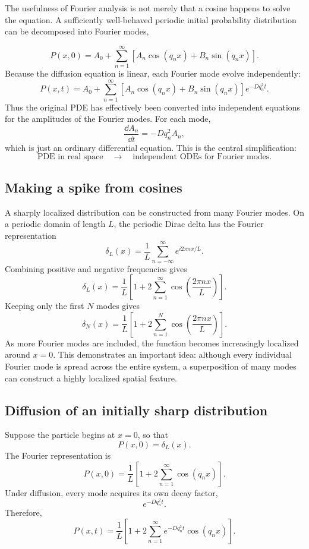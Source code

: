 The usefulness of Fourier analysis is not merely that a cosine happens to solve the equation.
A sufficiently well-behaved periodic initial probability distribution can be decomposed into Fourier modes,

\[
    P(x,0) = A_0 + \sum_{n=1}^{\infty} \left[ A_n\cos(q_nx) + B_n\sin(q_nx) \right].
\]
% 
Because the diffusion equation is linear, each Fourier mode evolve independently:
% 
\[
    P(x,t) = A_0 + \sum_{n=1}^{\infty} \left[ A_n\cos(q_nx) + B_n\sin(q_nx) \right] e^{-Dq_n^2t}.
\]
% 
Thus the original PDE has effectively been converted into independent equations for the amplitudes of the Fourier modes.
% 
For each mode,
% 
\[
    \frac{\dd A_n}{\dd t} = -Dq_n^2A_n,
\]
% 
which is just an ordinary differential equation.
% 
This is the central simplification:
% 
\[
    \boxed{
        \text{PDE in real space}
        \quad\longrightarrow\quad
        \text{independent ODEs for Fourier modes}.
    }
\]


\subsection{Making a spike from cosines}

A sharply localized distribution can be constructed from many Fourier modes.
On a periodic domain of length $L$, the periodic Dirac delta has the Fourier representation
% 
\[
    \boxed{
        \delta_L(x) = \frac{1}{L} \sum_{n=-\infty}^{\infty} e^{i2\pi nx/L}.
    }
\]
% 
Combining positive and negative frequencies gives
% 
\[
    \boxed{
        \delta_L(x) = \frac{1}{L} \left[ 1 + 2\sum_{n=1}^{\infty} \cos\left( \frac{2\pi n x}{L} \right) \right].
    }
\]
% 
Keeping only the first $N$ modes gives
% 
\[
    \delta_N(x) = \frac{1}{L} \left[ 1 + 2\sum_{n=1}^{N} \cos\left( \frac{2\pi n x}{L} \right) \right].
\]
% 
As more Fourier modes are included, the function becomes increasingly localized around $x=0$.
This demonstrates an important idea: although every individual Fourier mode is spread across the entire system, a superposition of many modes can construct a highly localized spatial feature.


\subsection{Diffusion of an initially sharp distribution}

Suppose the particle begins at $x=0$, so that
% 
\[
    P(x,0) = \delta_L(x).
\]
% 
The Fourier representation is
% 
\[
    P(x,0) = \frac{1}{L} \left[ 1 + 2\sum_{n=1}^{\infty} \cos(q_nx) \right].
\]
% 
Under diffusion, every mode acquires its own decay factor,
% 
\[
    e^{-Dq_n^2t}.
\]
% 
Therefore,
% 
\[
    \boxed{
        P(x,t) = \frac{1}{L} \left[ 1 + 2\sum_{n=1}^{\infty} e^{-Dq_n^2t} \cos(q_nx) \right].
    }
\]

